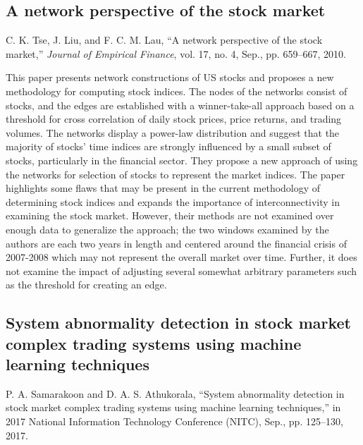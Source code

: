 \documentclass[12pt]{article}
\begin{document}
\subsection{A network perspective of the stock market}
C. K. Tse, J. Liu, and F. C. M. Lau, “A network perspective of the stock market,” \textit{Journal of Empirical Finance}, vol. 17, no. 4, Sep., pp. 659–667, 2010. %
\newline

This paper presents network constructions of US stocks and proposes a new methodology for computing stock indices. The nodes of the networks consist of stocks, and the edges are established with a winner-take-all approach based on a threshold for cross correlation of daily stock prices, price returns, and trading volumes. The networks display a power-law distribution and suggest that the majority of stocks' time indices are strongly influenced by a small subset of stocks, particularly in the financial sector. They propose a new approach of using the networks for selection of stocks to represent the market indices. The paper highlights some flaws that may be present in the current methodology of determining stock indices and expands the importance of interconnectivity in examining the stock market. However, their methods are not examined over enough data to generalize the approach; the two windows examined by the authors are each two years in length and centered around the financial crisis of 2007-2008 which may not represent the overall market over time. Further, it does not examine the impact of adjusting several somewhat arbitrary parameters such as the threshold for creating an edge.



\subsection{System abnormality detection in stock market complex trading systems using machine learning techniques}
P. A. Samarakoon and D. A. S. Athukorala, “System abnormality detection in stock market complex trading systems using machine learning techniques,” in 2017 National Information Technology Conference (NITC), Sep., pp. 125–130, 2017. %
\newline
\end{document}
